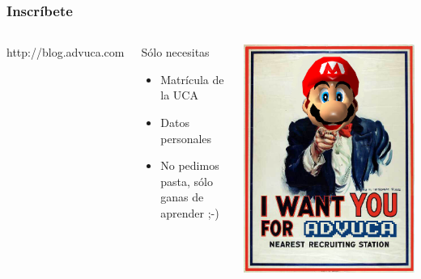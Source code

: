 \begin{frame}
	\frametitle{Inscríbete}
	
	\begin{columns}[c]
		\column{150pt}
	
	http://blog.advuca.com
		
	\begin{block}{Sólo necesitas}
            \begin{itemize}
                \item Matrícula de la UCA
		\item Datos personales
		\item No pedimos pasta, sólo ganas de aprender ;-)
            \end{itemize}            
        \end{block}        
		\column{150pt}
		\begin{center}
			\includegraphics[scale=0.22]{img/iwantyou.jpg}
		\end{center}
	\end{columns} 
	
\end{frame}
